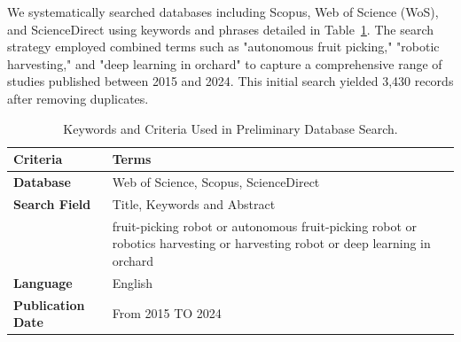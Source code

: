 \documentclass[pdflatex,sn-mathphys-num]{sn-jnl}
\begin{document}
We systematically searched databases including Scopus, Web of Science (WoS), and ScienceDirect using keywords and phrases detailed in Table~\ref{tab:keywords}. The search strategy employed combined terms such as "autonomous fruit picking," "robotic harvesting," and "deep learning in orchard" to capture a comprehensive range of studies published between 2015 and 2024. This initial search yielded 3,430 records after removing duplicates.


\begin{table}[ht]
\small
\caption{Keywords and Criteria Used in Preliminary Database Search.} 
\label{tab:keywords} 
\renewcommand{\arraystretch}{1.3}
\begin{tabular}{p{3.5cm} p{8cm}}
\hline
\textbf{Criteria} & \textbf{Terms} \\ \hline
\textbf{Database}  &  Web of Science, Scopus, ScienceDirect \\
\textbf{Search Field} & Title, Keywords and Abstract\\
 & fruit-picking robot or autonomous fruit-picking robot  or robotics harvesting or harvesting robot or deep learning in orchard\\
\textbf{Language} & English \\
\textbf{Publication Date} & From 2015 TO 2024 \\ \hline 
\end{tabular}
\end{table}
\end{document}
